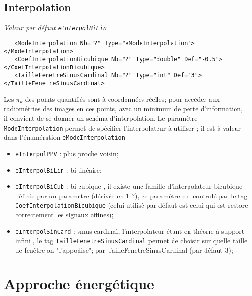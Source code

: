 \subsection{Interpolation}

\emph{Valeur par d\'efaut {\tt eInterpolBiLin}}

\begin{verbatim}
   <ModeInterpolation Nb="?" Type="eModeInterpolation"> </ModeInterpolation>
   <CoefInterpolationBicubique Nb="?" Type="double" Def="-0.5"> </CoefInterpolationBicubique>
   <TailleFenetreSinusCardinal Nb="?" Type="int" Def="3"> </TailleFenetreSinusCardinal>
\end{verbatim}

Les $\pi_k$ des  points quantifi\'es sont \`a coordonn\'ees r\'eelles;
pour acc\'eder aux radiom\'etries des images en ces points, avec
un minimum de perte d'information, il convient de se donner un
sch\'ema d'interpolation. Le param\`etre {\tt ModeInterpolation}
permet de sp\'ecifier l'interpolateur \`a utiliser ; il est
\`a valeur dans l'\'enum\'eration {\tt eModeInterpolation}:

\begin{itemize}
    \item{\tt eInterpolPPV}  : plus proche voisin;
    \item{\tt eInterpolBiLin}  : bi-lin\'eaire;
    \item{\tt eInterpolBiCub}  : bi-cubique , il existe une famille
         d'interpolateur bicubique d\'efinie par un param\`etre
         (d\'eriv\'ee en $1$ ?), ce param\`etre est control\'e par
         le tag {\tt CoefInterpolationBicubique} (celui utilis\'e par d\'efaut
         est celui qui est restore correctement les signaux  affines);
    \item{\tt eInterpolSinCard}  : sinus cardinal,  l'interpolateur
         \'etant en th\'eorie \`a support infini , le tag
         {\tt TailleFenetreSinusCardinal} permet de choisir sur
         quelle taille de fen\^etre on "l'appodise";
         par TailleFenetreSinusCardinal (par d\'efaut 3);
\end{itemize}


\section{Approche \'energ\'etique}

